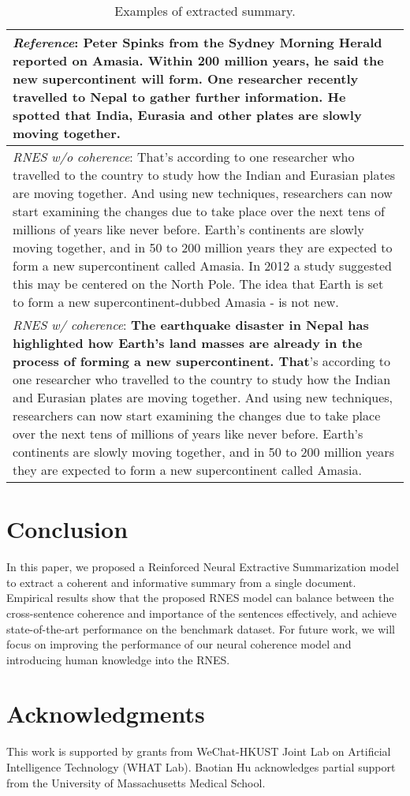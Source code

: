 \documentclass[letterpaper]{article} \usepackage{aaai18}  \usepackage{times}  \usepackage{helvet}  \usepackage{courier}  \usepackage{url}  \usepackage{graphicx}  \usepackage{amssymb}
\begin{document}
\begin{table}[ht]
		\centering
		\caption{Examples of extracted summary.}
		\label{tab:summary_examples}
		
		\begin{tabular}{|p{80mm}|}
			\hline
			\small{\textit{Reference}: Peter Spinks from the Sydney Morning Herald reported on Amasia. Within 200 million years, he said the new supercontinent will form. One researcher recently travelled to Nepal to gather further information. He spotted that India, Eurasia and other plates are slowly moving together.} \\\hline
			
			\small{\textit{RNES w/o coherence}: That's according to one researcher who travelled to the country to study how the Indian and Eurasian plates are moving together. And using new techniques, researchers can now start examining the changes due to take place over the next tens of millions of years like never before. Earth's continents are slowly moving together, and in 50 to 200 million years they are expected to form a new supercontinent called Amasia. In 2012 a study suggested this may be centered on the North Pole. The idea that Earth is set to form a new supercontinent-dubbed Amasia - is not new.}\\\hline

			\small{\textit{RNES w/ coherence}: \textbf{The earthquake disaster in Nepal has highlighted how Earth's land masses are already in the process of forming a new supercontinent. That}'s according to one researcher who travelled to the country to study how the Indian and Eurasian plates are moving together. And using new techniques, researchers can now start examining the changes due to take place over the next tens of millions of years like never before. Earth's continents are slowly moving together, and in 50 to 200 million years they are expected to form a new supercontinent called Amasia.} \\
			\hline
		\end{tabular}
	\end{table}


	\section{Conclusion}	
	In this paper, we proposed a Reinforced Neural Extractive Summarization model to extract a coherent and informative summary from a single document. Empirical results show that the proposed RNES model can balance between the cross-sentence coherence and importance of the sentences effectively, and achieve state-of-the-art performance on the benchmark dataset. For future work, we will focus on improving the performance of our neural coherence model and introducing human knowledge into the RNES.    
	
	\section*{Acknowledgments}
	This work is supported by grants from WeChat-HKUST Joint Lab on Artificial Intelligence Technology (WHAT Lab). Baotian Hu acknowledges partial support from the University of Massachusetts Medical School.
	
	
	
	
\end{document}

